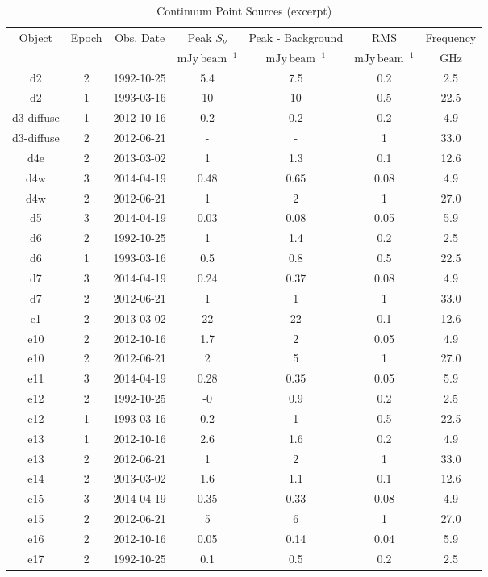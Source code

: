 \begin{table*}[htp]
\caption{Continuum Point Sources (excerpt)}
\begin{tabular}{ccccccc}
\label{tab:contsrcs}
Object & Epoch & Obs. Date & Peak $S_{\nu}$ & Peak - Background & RMS & Frequency \\
 &  &  & $\mathrm{mJy\,beam^{-1}}$ & $\mathrm{mJy\,beam^{-1}}$ & $\mathrm{mJy\,beam^{-1}}$ & $\mathrm{GHz}$ \\
\hline
d2 & 2 & 1992-10-25 & 5.4 & 7.5 & 0.2 & 2.5 \\
d2 & 1 & 1993-03-16 & 10 & 10 & 0.5 & 22.5 \\
d3-diffuse & 1 & 2012-10-16 & 0.2 & 0.2 & 0.2 & 4.9 \\
d3-diffuse & 2 & 2012-06-21 & - & - & 1 & 33.0 \\
d4e & 2 & 2013-03-02 & 1 & 1.3 & 0.1 & 12.6 \\
d4w & 3 & 2014-04-19 & 0.48 & 0.65 & 0.08 & 4.9 \\
d4w & 2 & 2012-06-21 & 1 & 2 & 1 & 27.0 \\
d5 & 3 & 2014-04-19 & 0.03 & 0.08 & 0.05 & 5.9 \\
d6 & 2 & 1992-10-25 & 1 & 1.4 & 0.2 & 2.5 \\
d6 & 1 & 1993-03-16 & 0.5 & 0.8 & 0.5 & 22.5 \\
d7 & 3 & 2014-04-19 & 0.24 & 0.37 & 0.08 & 4.9 \\
d7 & 2 & 2012-06-21 & 1 & 1 & 1 & 33.0 \\
e1 & 2 & 2013-03-02 & 22 & 22 & 0.1 & 12.6 \\
e10 & 2 & 2012-10-16 & 1.7 & 2 & 0.05 & 4.9 \\
e10 & 2 & 2012-06-21 & 2 & 5 & 1 & 27.0 \\
e11 & 3 & 2014-04-19 & 0.28 & 0.35 & 0.05 & 5.9 \\
e12 & 2 & 1992-10-25 & -0 & 0.9 & 0.2 & 2.5 \\
e12 & 1 & 1993-03-16 & 0.2 & 1 & 0.5 & 22.5 \\
e13 & 1 & 2012-10-16 & 2.6 & 1.6 & 0.2 & 4.9 \\
e13 & 2 & 2012-06-21 & 1 & 2 & 1 & 33.0 \\
e14 & 2 & 2013-03-02 & 1.6 & 1.1 & 0.1 & 12.6 \\
e15 & 3 & 2014-04-19 & 0.35 & 0.33 & 0.08 & 4.9 \\
e15 & 2 & 2012-06-21 & 5 & 6 & 1 & 27.0 \\
e16 & 2 & 2012-10-16 & 0.05 & 0.14 & 0.04 & 5.9 \\
e17 & 2 & 1992-10-25 & 0.1 & 0.5 & 0.2 & 2.5 \\

\end{tabular}
\end{table*}
